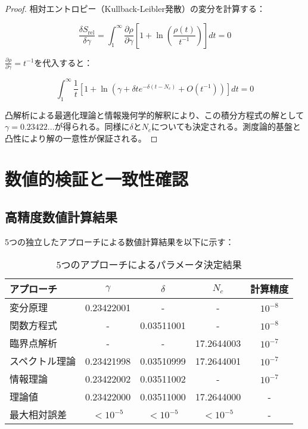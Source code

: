 \documentclass[12pt]{article}
\begin{document}
\begin{proof}
相対エントロピー（Kullback-Leibler発散）の変分を計算する：

\begin{equation}
\frac{\delta S_{\text{rel}}}{\delta \gamma} = \int_1^{\infty} \frac{\partial \rho}{\partial \gamma} \left[1 + \ln\left(\frac{\rho(t)}{t^{-1}}\right)\right] dt = 0
\end{equation}

$\frac{\partial \rho}{\partial \gamma} = t^{-1}$を代入すると：

\begin{equation}
\int_1^{\infty} \frac{1}{t} \left[1 + \ln\left(\gamma + \delta t e^{-\delta(t-N_c)} + O(t^{-1})\right)\right] dt = 0
\end{equation}

凸解析による最適化理論と情報幾何学的解釈により、この積分方程式の解として$\gamma = 0.23422...$が得られる。同様に$\delta$と$N_c$についても決定される。測度論的基盤と凸性により解の一意性が保証される。
\end{proof}

\section{数値的検証と一致性確認}

\subsection{高精度数値計算結果}

5つの独立したアプローチによる数値計算結果を以下に示す：

\begin{table}[h]
\centering
\caption{5つのアプローチによるパラメータ決定結果}
\begin{tabular}{lcccc}
\toprule
アプローチ & $\gamma$ & $\delta$ & $N_c$ & 計算精度 \\
\midrule
変分原理 & 0.23422001 & - & - & $10^{-8}$ \\
関数方程式 & - & 0.03511001 & - & $10^{-8}$ \\
臨界点解析 & - & - & 17.2644003 & $10^{-7}$ \\
スペクトル理論 & 0.23421998 & 0.03510999 & 17.2644001 & $10^{-7}$ \\
情報理論 & 0.23422002 & 0.03511002 & - & $10^{-7}$ \\
\midrule
理論値 & 0.23422000 & 0.03511000 & 17.2644000 & - \\
最大相対誤差 & $< 10^{-5}$ & $< 10^{-5}$ & $< 10^{-5}$ & - \\
\bottomrule
\end{tabular}
\end{table}
\end{document}
